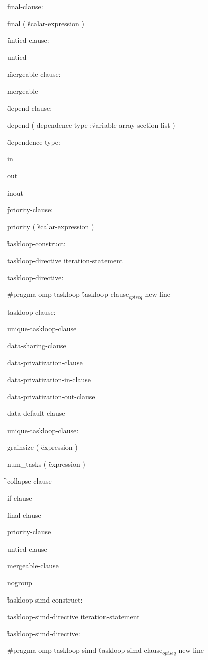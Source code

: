 {final-clause:

\C\I final ( \G scalar-expression \C )

\G untied-clause:

\C\I untied

\G mergeable-clause:

\C\I mergeable

\G depend-clause:

\C\I depend ( \G dependence-type \C :\G variable-array-section-list \C )

\G dependence-type:

\C\I in

\I out

\I inout

\G priority-clause:

\C\I priority ( \G scalar-expression \C )

\G taskloop-construct:

\I taskloop-directive iteration-statement

taskloop-directive:

\C\I \#pragma omp taskloop \G taskloop-clause$_{optseq}$ new-line

taskloop-clause:

\I unique-taskloop-clause 

\I data-sharing-clause

\I data-privatization-clause

\I data-privatization-in-clause

\I data-privatization-out-clause

\I data-default-clause

unique-taskloop-clause:

\C\I grainsize ( \G expression \C )

\I num\_tasks ( \G expression \C )

\G\I collapse-clause

\I if-clause

\I final-clause

\I priority-clause

\I untied-clause

\I mergeable-clause

\C\I nogroup

\G taskloop-simd-construct:

\I taskloop-simd-directive iteration-statement

\G taskloop-simd-directive:

\C\I \#pragma omp taskloop simd \G taskloop-simd-clause$_{optseq}$ new-line

}

